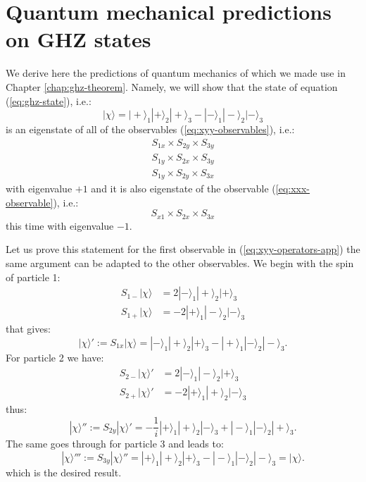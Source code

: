 \section{Quantum mechanical predictions on GHZ states}
We derive here the predictions of quantum mechanics of which we made use in Chapter \ref{chap:ghz-theorem}. Namely, we will show that the state of equation (\ref{eq:ghz-state}), i.e.:
\begin{equation*}
  |\chi\rangle = |+\rangle_1 |+\rangle_2 |+\rangle_3 - |-\rangle_1 |-\rangle_2 |-\rangle_3
\end{equation*}
is an eigenstate of all of the observables (\ref{eq:xyy-observables}), i.e.:
\begin{equation}
  \begin{split}
    S_{1x} \times S_{2y} \times S_{3y}\\
    S_{1y} \times S_{2x} \times S_{3y}\\
    S_{1y} \times S_{2y} \times S_{3x}
  \end{split}
  \label{eq:xyy-operators-app}
\end{equation}
with eigenvalue $+ 1$ and it is also eigenstate of the observable (\ref{eq:xxx-observable}), i.e.:
\begin{equation*}
  S_{x1} \times S_{2x} \times S_{3x}
\end{equation*}
this time with eigenvalue $- 1$.

Let us prove this statement for the first observable in (\ref{eq:xyy-operators-app}) the same argument can be adapted to the other observables. We begin with the spin of particle 1:
\begin{equation*}
  \begin{split}
    S_{1-} |\chi\rangle &= 2 |-\rangle_1 |+\rangle_2 |+\rangle_3\\
    S_{1+} |\chi\rangle &= - 2 |+\rangle_1 |-\rangle_2 |-\rangle_3
  \end{split}
\end{equation*}
that gives:
\begin{equation*}
  |\chi\rangle' := S_{1x} |\chi\rangle = |-\rangle_1 |+\rangle_2 |+\rangle_3 - |+\rangle_1 |-\rangle_2 |-\rangle_3.
\end{equation*}
For particle 2 we have:
\begin{equation*}
  \begin{split}
    S_{2-} |\chi\rangle' &= 2 |-\rangle_1 |-\rangle_2 |+\rangle_3\\
    S_{2+} |\chi\rangle' &= - 2 |+\rangle_1 |+\rangle_2 |-\rangle_3
  \end{split}
\end{equation*}
thus:
\begin{equation*}
  |\chi\rangle'' := S_{2y} |\chi\rangle' = - \frac{1}{i} |+\rangle_1 |+\rangle_2 |-\rangle_3 + |-\rangle_1 |-\rangle_2 |+\rangle_3.
\end{equation*}
The same goes through for particle 3 and leads to:
\begin{equation*}
  |\chi\rangle''' := S_{3y} |\chi\rangle'' = |+\rangle_1 |+\rangle_2 |+\rangle_3 - |-\rangle_1 |-\rangle_2 |-\rangle_3 = |\chi\rangle.
\end{equation*}
which is the desired result.
